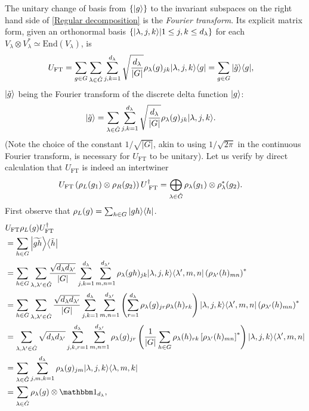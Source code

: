 The unitary change of basis from $\{{\left\vert{g}\right\rangle}\}$ to the invariant subspaces on the right hand side of \eqref{Regular decomposition} is the \emph{Fourier transform}. Its explicit matrix form, given an orthonormal basis $\{{\left\vert{\lambda,j,k}\right\rangle}|1\le j,k\le d_{\lambda}\}$ for each $V_{\lambda} \otimes V_{\lambda}^* \simeq \text{End}(V_{\lambda})$, is
\begin{align}\label{Fourier transform:unitary}
U_{\text{FT}} &= \sum_{g \in G} \sum_{\lambda \in \hat{G}} \sum_{j,k=1}^{d_{\lambda}} \sqrt{\frac{d_{\lambda}}{|G|}} \rep_{\lambda}(g)_{jk} \ketbra{\lambda,j,k}{g} = \sum_{g\in G} \ketbra{\tilde{g}}{g},
\end{align}
${\left\vert{\tilde{g}}\right\rangle}$ being the Fourier transform of the discrete delta function ${\left\vert{g}\right\rangle}$:
\begin{align}\label{Fourier transform}
\ket{\tilde{g}} &= \sum_{\lambda \in \hat{G}} \sum_{j,k=1}^{d_{\lambda}} \sqrt{\frac{d_{\lambda}}{|G|}} \rep_{\lambda}(g)_{jk} \ket{\lambda,j,k}.
\end{align}
(Note the choice of the constant $1/\sqrt{|G|}$, akin to using $1/\sqrt{2\pi}$ in the continuous Fourier transform, is necessary for $U_{\text{FT}}$ to be unitary).
Let us verify by direct calculation that $U_{\text{FT}}$ is indeed an intertwiner
\begin{align}
U_{\text{FT}} \left( \rho_L(g_1) \otimes \rho_R(g_2) \right) U_{\text{ FT}}^{\dagger}
&= \bigoplus_{\lambda \in \hat{G}} \rho_{\lambda}(g_1) \otimes \rho_{\lambda}^*(g_2).
\end{align}
First observe that $\rho_L(g) = \sum_{h \in G} {\left\vert{gh}\right\rangle}{\left\langle{h}\right\vert}$.
\begin{align*}
&U_{\text{FT}} \rep_L (g) U_{\text{FT}}\dgg  \\
&= \sum_{h \in G} \ketbra{\widetilde{gh}}{\tilde{h}} \\
&= \sum_{h \in G} \sum_{\lambda,\lambda' \in \hat{G}} \!\!\!
\frac{ \sqrt{d_{\lambda} d_{\lambda'}} }{|G|}
\sum_{j,k=1}^{d_{\lambda}} \sum_{m,n=1}^{d_{\lambda'}}
\rep_{\lambda} (gh)_{jk} \ketbra{\lambda,j,k}{\lambda',m,n}  \left( \rep_{\lambda'} (h)_{mn} \right)^* \\
&= \sum_{h \in G} \sum_{\lambda,\lambda' \in \hat{G}}
\frac{ \sqrt{d_{\lambda} d_{\lambda'}} }{|G|}
\sum_{j,k=1}^{d_{\lambda}} \sum_{m,n=1}^{d_{\lambda'}}
\left( \sum_{r=1}^{d_{\lambda}} \rep_{\lambda} (g)_{jr} \rep_{\lambda} (h)_{rk} \right) \ketbra{\lambda,j,k}{\lambda',m,n}  \left( \rep_{\lambda'} (h)_{mn} \right)^* \\
&= \sum_{\lambda,\lambda' \in \hat{G}} \sqrt{d_{\lambda} d_{\lambda'}}
\sum_{j,k,r=1}^{d_{\lambda}} \sum_{m,n=1}^{d_{\lambda'}} \rep_{\lambda} (g)_{jr}
\left( \frac{1}{|G|}  \sum_{h \in G}\rep_{\lambda} (h)_{rk} \left[ \rep_{\lambda'} (h)_{mn} \right]^* \right)
\ketbra{\lambda,j,k}{\lambda',m,n} \\
&= \sum_{\lambda \in \hat{G}} \sum_{j,m,k=1}^{d_{\lambda}} \rep_{\lambda} (g)_{jm} \ketbra{\lambda,j,k}{\lambda,m,k} \\
&= \sum_{\lambda \in \hat{G}} \rep_{\lambda} (g) \otimes \id_{d_{\lambda}},
\end{align*}
